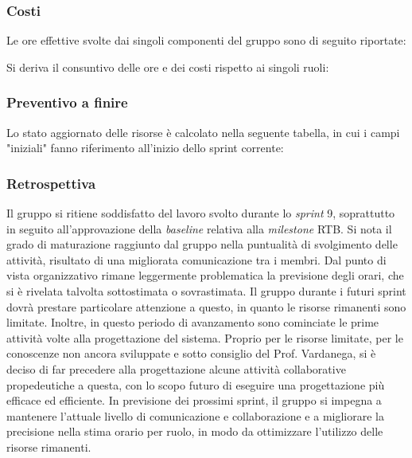 \documentclass[10pt, letterpaper]{article}
\begin{document}
\subsubsection{Costi}
Le ore effettive svolte dai singoli componenti del gruppo sono di seguito riportate:

\setRuoloValeria{\Proge}
\setRuoloLeonardo{\Amm}
\setRuoloFilippo{\Proge}
\setRuoloGiuseppe{\Proge}
\setRuoloFrancesco{\Proge}
\setRuoloChristian{\Verif}
\setRuoloLuca{\Resp}



Si deriva il consuntivo delle ore e dei costi rispetto ai singoli ruoli:

\subsubsection{Preventivo a finire}
Lo stato aggiornato delle risorse è calcolato nella seguente tabella, in cui i campi "iniziali" fanno riferimento all'inizio dello sprint corrente:


\subsubsection{Retrospettiva}
Il gruppo si ritiene soddisfatto del lavoro svolto durante lo \textit{sprint} 9, soprattutto in seguito all'approvazione della \textit{baseline} relativa alla \textit{milestone} RTB. 
Si nota il grado di maturazione raggiunto dal gruppo nella puntualità di svolgimento delle attività, risultato di una migliorata comunicazione tra i membri.
Dal punto di vista organizzativo rimane leggermente problematica la previsione degli orari, che si è rivelata talvolta sottostimata o sovrastimata. 
Il gruppo durante i futuri sprint dovrà prestare particolare attenzione a questo, in quanto le risorse rimanenti sono limitate. 
Inoltre, in questo periodo di avanzamento sono cominciate le prime attività volte alla progettazione del sistema. Proprio per le risorse limitate, per le conoscenze non ancora sviluppate e sotto consiglio del Prof. Vardanega, si è deciso di far precedere alla progettazione alcune attività collaborative propedeutiche a questa, con lo scopo futuro di eseguire una progettazione più efficace ed efficiente.
In previsione dei prossimi sprint, il gruppo si impegna a mantenere l'attuale livello di comunicazione e collaborazione e a migliorare la precisione nella stima orario per ruolo, in modo da ottimizzare l'utilizzo delle risorse rimanenti.
\end{document}
